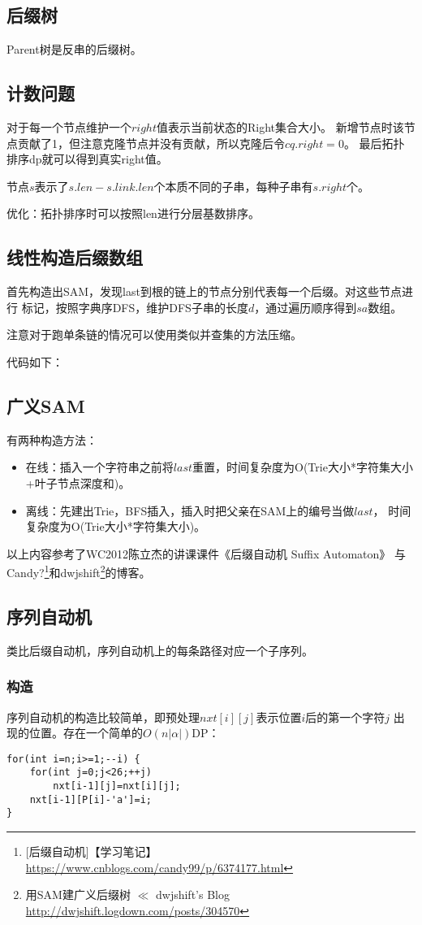 \subsection{后缀树}
Parent树是反串的后缀树。
\subsection{计数问题}
对于每一个节点维护一个$right$值表示当前状态的Right集合大小。
新增节点时该节点贡献了1，但注意克隆节点并没有贡献，所以克隆后令$cq.right=0$。
最后拓扑排序dp就可以得到真实right值。

节点$s$表示了$s.len-s.link.len$个本质不同的子串，每种子串有$s.right$个。

优化：拓扑排序时可以按照len进行分层基数排序。
\subsection{线性构造后缀数组}
首先构造出SAM，发现last到根的链上的节点分别代表每一个后缀。对这些节点进行
标记，按照字典序DFS，维护DFS子串的长度$d$，通过遍历顺序得到$sa$数组。

注意对于跑单条链的情况可以使用类似并查集的方法压缩。

代码如下：

\subsection{广义SAM}
有两种构造方法：
\begin{itemize}
    \item 在线：插入一个字符串之前将$last$重置，时间复杂度为O(Trie大小*字符集大小
    +叶子节点深度和)。
    \item 离线：先建出Trie，BFS插入，插入时把父亲在SAM上的编号当做$last$，
    时间复杂度为O(Trie大小*字符集大小)。
\end{itemize}

以上内容参考了WC2012陈立杰的讲课课件《后缀自动机 Suffix Automaton》
与Candy?\footnote{[后缀自动机]【学习笔记】
    \url{https://www.cnblogs.com/candy99/p/6374177.html}
}和dwjshift\footnote{
    用SAM建广义后缀树 $\ll$ dwjshift's Blog
    \url{http://dwjshift.logdown.com/posts/304570}
}的博客。

\subsection{序列自动机}
类比后缀自动机，序列自动机上的每条路径对应一个子序列。

\subsubsection{构造}
序列自动机的构造比较简单，即预处理$nxt[i][j]$表示位置$i$后的第一个字符$j$
出现的位置。存在一个简单的$O(n|\alpha|)$DP：
\begin{lstlisting}
for(int i=n;i>=1;--i) {
    for(int j=0;j<26;++j)
        nxt[i-1][j]=nxt[i][j];
    nxt[i-1][P[i]-'a']=i;
}
\end{lstlisting}

